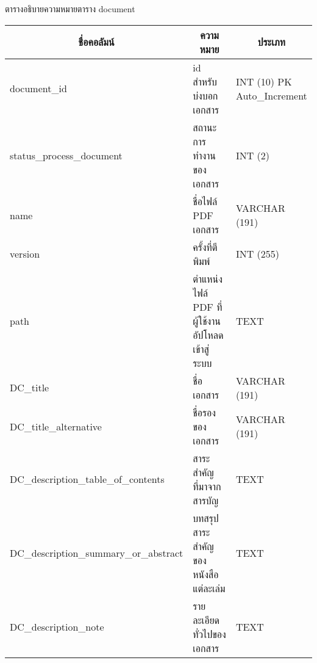 \begin{table}
\caption{ตารางอธิบายความหมายตาราง document}\label{tbl:document}
\vspace*{-1.25em}
\end{table}
\begin{longtable}[l]{|l|l|l|}
\hline
\multicolumn{1}{|c|}{ชื่อคอลัมน์}      & \multicolumn{1}{c|}{ความหมาย}                    & \multicolumn{1}{c|}{ประเภท}                                                       \\ \hline \endhead
document\_id                           & id สำหรับบ่งบอกเอกสาร                            & \makecell[l]{INT   (10) PK\\Auto\_Increment}     \\ \hline
status\_process\_document              & สถานะการทำงานของเอกสาร                           & INT   (2)                                                                         \\ \hline
name                                   & ชื่อไฟล์   PDF เอกสาร                            & VARCHAR   (191)                                                                   \\ \hline
version                                & ครั้งที่ตีพิมพ์                                  & INT   (255)                                                                       \\ \hline
path                                   & ตำแหน่งไฟล์   PDF ที่ผู้ใช้งานอัปโหลดเข้าสู่ระบบ & TEXT                                                                              \\ \hline
DC\_title                              & ชื่อเอกสาร                                       & VARCHAR   (191)                                                                   \\ \hline
DC\_title\_alternative                 & ชื่อรองของเอกสาร                                 & VARCHAR   (191)                                                                   \\ \hline
DC\_description\_table\_of\_contents   & สาระสำคัญที่มาจากสารบัญ                          & TEXT                                                                              \\ \hline
DC\_description\_summary\_or\_abstract & บทสรุปสาระสำคัญของหนังสือแต่ละเล่ม               & TEXT                                                                              \\ \hline
DC\_description\_note                  & รายละเอียดทั่วไปของเอกสาร                        & TEXT                                                                              \\ \hline

\end{longtable}
